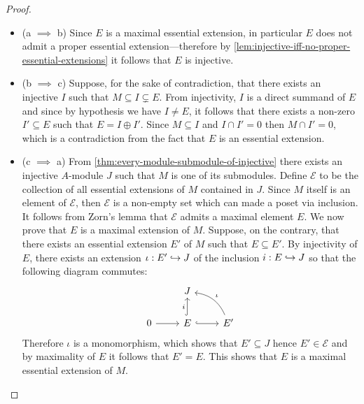\begin{proof}
    \begin{itemize}\setlength\itemsep{0em}
        \item (a \(\implies\) b) Since \(E\) is a maximal essential extension, in
              particular \(E\) does not admit a proper essential extension---therefore by
              \cref{lem:injective-iff-no-proper-essential-extensions} it follows that \(E\)
              is injective.

        \item (b \(\implies\) c) Suppose, for the sake of contradiction, that there
              exists an injective \(I\) such that \(M \subseteq I \subsetneq E\). From injectivity,
              \(I\) is a direct summand of \(E\) and since by hypothesis we have
              \(I \neq E\), it follows that there exists a non-zero \(I' \subseteq E\) such that
              \(E = I \oplus I'\). Since \(M \subseteq I\) and \(I \cap I' = 0\) then \(M \cap I' = 0\), which
              is a contradiction from the fact that \(E\) is an essential extension.

        \item (c \(\implies\) a) From \cref{thm:every-module-submodule-of-injective}
              there exists an injective \(A\)-module \(J\) such that \(M\) is one of its
              submodules. Define \(\mathcal{E}\) to be the collection of all essential extensions of
              \(M\) contained in \(J\). Since \(M\) itself is an element of \(\mathcal{E}\), then
              \(\mathcal{E}\) is a non-empty set which can made a poset via inclusion. It follows from
              Zorn's lemma that \(\mathcal{E}\) admits a maximal element \(E\). We now prove that
              \(E\) is a maximal extension of \(M\). Suppose, on the contrary, that there
              exists an essential extension \(E'\) of \(M\) such that \(E \subseteq E'\). By
              injectivity of \(E\), there exists an extension \(\iota: E' \hookrightarrow J\) of the
              inclusion \(i: E \hookrightarrow J\) so that the following diagram commutes:
              \[
                  \begin{tikzcd}
                      &J &\\
                      0 \ar[r]
                      &E \ar[r, hook] \ar[u, "i", hook]
                      & E' \ar[ul, bend right, "\iota"']
                  \end{tikzcd}
              \]
              Therefore \(\iota\) is a monomorphism, which shows that \(E' \subseteq J\) hence
              \(E' \in \mathcal{E}\) and by maximality of \(E\) it follows that \(E' = E\). This shows
              that \(E\) is a maximal essential extension of \(M\).
    \end{itemize}
\end{proof}





